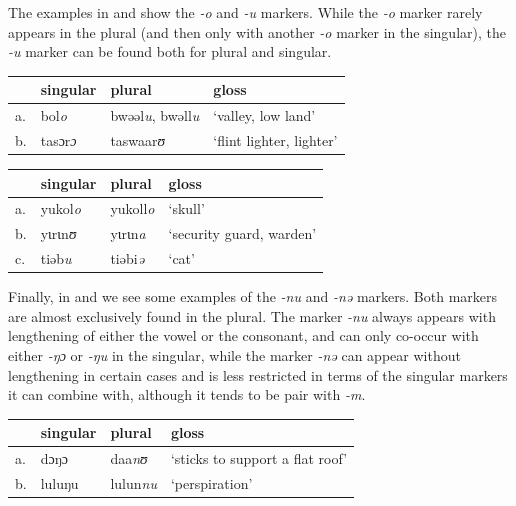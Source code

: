 The examples in  and  show the \textit{-o} and \textit{-u} markers. While the \textit{-o} marker rarely appears in the plural (and then only with another \textit{-o} marker in the singular), the \textit{-u} marker can be found both for plural and singular.

\begin{exe}
    \ex \label{osg-kasem}
    \begin{tabular}[t]{llll}
      & singular        & plural                           & gloss                    \\
      \midrule
      a. & bol\textit{o}   & bwəəl\textit{u}, bwəll\textit{u} & `valley, low land'       \\
      b. & tasɔr\textit{ɔ} & taswaar\textit{ʊ}                & `flint lighter, lighter' \\
    \end{tabular}
\end{exe}

\begin{exe}
    \ex \label{opl-kasem}
    \begin{tabular}[t]{llll}
      & singular & plural  & gloss                    \\
      \midrule
      a. & yukol\textit{o}   & yukoll\textit{o} & `skull'                  \\
      b. & yɩrɩn\textit{ʊ}   & yɩrɩn\textit{a}  & `security guard, warden' \\
      c. & tiəb\textit{u}    & tiəbi\textit{ə}  & `cat'                    \\
    \end{tabular}
\end{exe}

Finally, in  and  we see some examples of the \textit{-nu} and \textit{-nə} markers. Both markers are almost exclusively found in the plural. The marker \textit{-nu} always appears with lengthening of either the vowel or the consonant,
and can only co-occur with either \textit{-ŋɔ} or \textit{-ŋu} in the singular, while the marker \textit{-nə} can appear without lengthening in certain cases and is less restricted in terms of the singular markers it can combine with, although it tends to be pair with \textit{-m}.

\begin{exe}
    \ex \label{nupl-kasem}
    \begin{tabular}[t]{llll}
      & singular & plural  & gloss                           \\
      \midrule
      a. & dɔŋɔ     & daa\textit{nʊ}   & `sticks to support a flat roof' \\
      b. & luluŋu   & lulun\textit{nu} & `perspiration'                  \\
    \end{tabular}
\end{exe}

